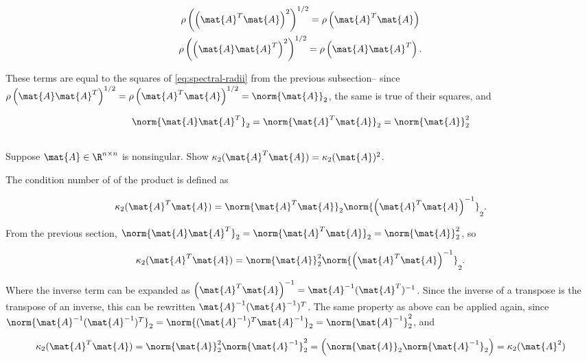 \documentclass{template}
\begin{document}
\begin{equation}
    \begin{gathered}
        \rho\left( \left(\mat{A}^T\mat{A}\right)^2\right)^{1/2} = \rho\left( \mat{A}^T\mat{A}\right)\\
        \rho\left( \left(\mat{A}\mat{A}^T\right)^2\right)^{1/2} = \rho\left( \mat{A}\mat{A}^T\right).
    \end{gathered}
\end{equation}

These terms are equal to the squares of \autoref{eq:spectral-radii} from the previous subsection-- since $\rho\left( \mat{A}\mat{A}^T\right)^{1/2} = \rho\left( \mat{A}^T\mat{A}\right)^{1/2} = \norm{\mat{A}}_2$, the same is true of their squares, and 

\begin{equation}
    \norm{\mat{A}\mat{A}^T}_2 = \norm{\mat{A}^T\mat{A}}_2 = \norm{\mat{A}}_2^2
\end{equation}

\subsection{}
Suppose $\mat{A} \in \R^{n\times n}$ is nonsingular. Show $\kappa_2(\mat{A}^T\mat{A}) = \kappa_2(\mat{A})^2$.

The condition number of of the product is defined as

\begin{equation}
    \kappa_2(\mat{A}^T\mat{A}) = \norm{\mat{A}^T\mat{A}}_2 \norm{\left(\mat{A}^T\mat{A}\right)^{-1}}_2.
\end{equation}

From the previous section, $\norm{\mat{A}\mat{A}^T}_2 = \norm{\mat{A}^T\mat{A}}_2 = \norm{\mat{A}}_2^2$, so 

\begin{equation}
    \kappa_2(\mat{A}^T\mat{A}) = \norm{\mat{A}}_2^2 \norm{\left(\mat{A}^T\mat{A}\right)^{-1}}_2.
\end{equation}

Where the inverse term can be expanded as $\left(\mat{A}^T\mat{A}\right)^{-1} = \mat{A}^{-1}(\mat{A}^T)^{-1}$. Since the inverse of a transpose is the transpose of an inverse, this can be rewritten $\mat{A}^{-1}(\mat{A}^{-1})^{T}$. The same property as above can be applied again, since $\norm{\mat{A}^{-1}(\mat{A}^{-1})^T}_2 = \norm{(\mat{A}^{-1})^T\mat{A}^{-1}}_2 = \norm{\mat{A}^{-1}}_2^2$, and 

\begin{equation}
    \kappa_2(\mat{A}^T\mat{A}) = \norm{\mat{A}}_2^2 \norm{\mat{A}^{-1}}_2^2 = \left(\norm{\mat{A}}_2\norm{\mat{A}^{-1}}_2\right) = \kappa_2(\mat{A}^2)
\end{equation}
\end{document}
